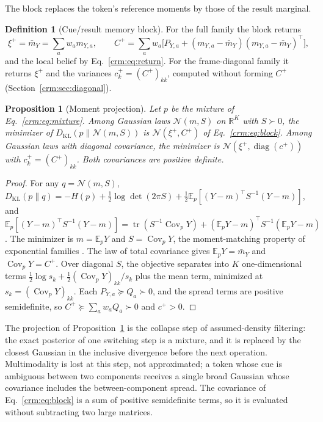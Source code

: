 \documentclass[11pt]{article}
\newtheorem{proposition}[theorem]{Proposition}
\theoremstyle{definition}
\newtheorem{definition}[theorem]{Definition}
\theoremstyle{remark}
\providecommand{\tr}{\operatorname{tr}}
\providecommand{\KL}{D_{\mathrm{KL}}}
\newcommand{\E}{\mathbb E}
\newcommand{\R}{\mathbb R}
\newcommand{\Gauss}{\mathcal N}
\newcommand{\Cov}{\operatorname{Cov}}
\newcommand{\diag}{\operatorname{diag}}
\begin{document}
The block replaces the token's reference moments by those of the result marginal.

\begin{definition}[Cue/result memory block]
\label{crm:def:block}
For the full family the block returns
\begin{equation}
\xi^+=\bar m_Y=\sum_aw_am_{Y,a},\qquad
C^+=\sum_aw_a\bigl[P_{Y,a}+(m_{Y,a}-\bar m_Y)(m_{Y,a}-\bar m_Y)^\top\bigr],
\label{crm:eq:block}
\end{equation}
and the local belief by Eq.~\eqref{crm:eq:return}. For the frame-diagonal family it returns $\xi^+$ and the variances $c^+_k=(C^+)_{kk}$, computed without forming $C^+$ (Section~\ref{crm:sec:diagonal}).
\end{definition}

\begin{proposition}[Moment projection]
\label{crm:prop:mproj}
Let $p$ be the mixture of Eq.~\eqref{crm:eq:mixture}. Among Gaussian laws $\Gauss(m,S)$ on $\R^K$ with $S\succ0$, the minimizer of $\KL(p\|\Gauss(m,S))$ is $\Gauss(\xi^+,C^+)$ of Eq.~\eqref{crm:eq:block}. Among Gaussian laws with diagonal covariance, the minimizer is $\Gauss(\xi^+,\diag(c^+))$ with $c^+_k=(C^+)_{kk}$. Both covariances are positive definite.
\end{proposition}

\begin{proof}
For any $q=\Gauss(m,S)$, $\KL(p\|q)=-H(p)+\tfrac12\log\det(2\pi S)+\tfrac12\E_p[(Y-m)^\top S^{-1}(Y-m)]$, and $\E_p[(Y-m)^\top S^{-1}(Y-m)]=\tr(S^{-1}\Cov_p Y)+(\E_pY-m)^\top S^{-1}(\E_pY-m)$. The minimizer is $m=\E_pY$ and $S=\Cov_pY$, the moment-matching property of exponential families \citep{Minka2001Thesis}. The law of total covariance gives $\E_pY=\bar m_Y$ and $\Cov_pY=C^+$. Over diagonal $S$, the objective separates into $K$ one-dimensional terms $\tfrac12\log s_k+\tfrac12(\Cov_pY)_{kk}/s_k$ plus the mean term, minimized at $s_k=(\Cov_pY)_{kk}$. Each $P_{Y,a}\succeq Q_a\succ0$, and the spread terms are positive semidefinite, so $C^+\succeq\sum_aw_aQ_a\succ0$ and $c^+>0$.
\end{proof}

The projection of Proposition~\ref{crm:prop:mproj} is the collapse step of assumed-density filtering: the exact posterior of one switching step is a mixture, and it is replaced by the closest Gaussian in the inclusive divergence before the next operation. Multimodality is lost at this step, not approximated; a token whose cue is ambiguous between two components receives a single broad Gaussian whose covariance includes the between-component spread. The covariance of Eq.~\eqref{crm:eq:block} is a sum of positive semidefinite terms, so it is evaluated without subtracting two large matrices.
\end{document}
